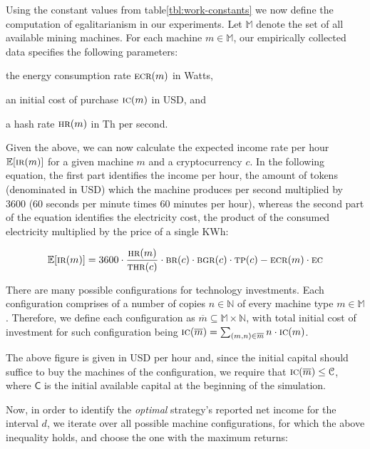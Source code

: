 
Using the constant values from table\ref{tbl:work-constants} we now define the
computation of egalitarianism in our experiments.  Let $\mathbb{M}$ denote the set of
all available mining machines. For each machine $m \in \mathbb{M}$, our empirically
collected data specifies the following parameters:
\begin{inparaenum}[i)]
    \item the energy consumption rate $\textsc{ecr}(m)$ in Watts,
    \item an initial cost of purchase $\textsc{ic}(m)$ in USD, and
    \item a hash rate $\textsc{hr}(m)$ in Th per second.
\end{inparaenum}
Given the above, we can now calculate the expected income rate per hour
$\mathbb{E}[\textsc{ir}(m)]$ for a given machine $m$ and a cryptocurrency $c$. In the
following equation, the first part identifies the income per hour, \ie the
amount of tokens (denominated in USD) which the machine produces per second
multiplied by $3600$ ($60$ seconds per minute times $60$ minutes per hour),
whereas the second part of the equation identifies the electricity cost, \ie
the product of the consumed electricity multiplied by the price of a single
KWh:

\[
\mathbb{E}[\textsc{ir}(m)] = 3600 \cdot \frac{\textsc{hr}(m)}{\textsc{thr}(c)} \cdot \textsc{br}(c) \cdot \textsc{bgr}(c) \cdot \textsc{tp}(c) - \textsc{ecr}(m) \cdot \textsc{ec}
\]

There are many possible configurations for technology investments. Each
configuration comprises of a number of copies $n \in \mathbb{N}$ of every
machine type $m \in \mathbb{M}$. Therefore, we define each configuration as
$\overline{m} \subseteq \mathbb{M} \times \mathbb{N}$, with
total initial cost of investment for such configuration being
$\textsc{ic}(\overline{m}) = \sum_{(m, n) \in \overline{m}}{n \cdot \textsc{ic}(m)}$.

The above figure is given in USD per hour and, since the initial capital should
suffice to buy the machines of the configuration, we require that
$\textsc{ic}(\overline{m}) \leq \mathcal{C}$,
where $\mathsf{C}$ is the initial available capital at the beginning of the simulation.

Now, in order to identify the \emph{optimal} strategy's reported net income for the
interval $d$, we iterate over all possible machine configurations, for which
the above inequality holds, and choose the one with the maximum returns:

